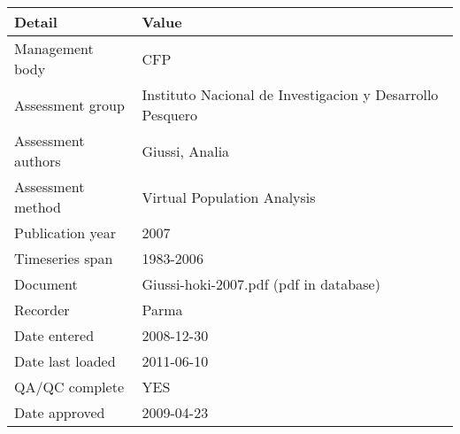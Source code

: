 \begin{table}[htb]
\centering
\begin{tabular}{lp{7cm}}
\toprule
Detail & Value \\
\midrule
Management body    & CFP                                                       \\
Assessment group   & Instituto Nacional de Investigacion y Desarrollo Pesquero \\
Assessment authors & Giussi, Analia                                            \\
Assessment method  & Virtual Population Analysis                               \\
Publication year   & 2007                                                      \\
Timeseries span    & 1983-2006                                                 \\
Document           & Giussi-hoki-2007.pdf (pdf in database)                    \\
Recorder           & Parma                                                     \\
Date entered       & 2008-12-30                                                \\
Date last loaded   & 2011-06-10                                                \\
QA/QC complete     & YES                                                       \\
Date approved      & 2009-04-23                                                \\
\bottomrule
\end{tabular}
\label{tab:assessdet}
\end{table}
